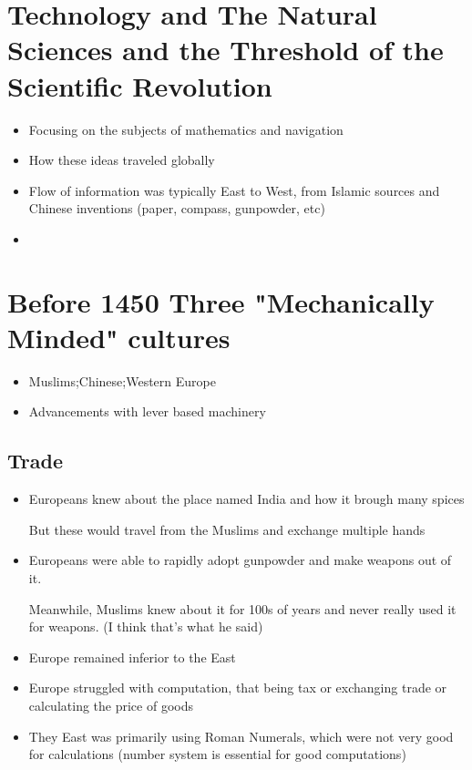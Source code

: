 \documentclass{article}
\begin{document}
\newpage

\section{Technology and The Natural Sciences and
the Threshold of the Scientific Revolution}

\begin{itemize}
  \item Focusing on the subjects of mathematics and navigation
  \item How these ideas traveled globally
  \item Flow of information was typically East to West,
    from Islamic sources and Chinese inventions (paper, compass, gunpowder, etc)
  \item
\end{itemize}

\section*{Before 1450 Three "Mechanically Minded" cultures}
\begin{itemize}
  \item Muslims;Chinese;Western Europe
  \item Advancements with lever based
    machinery
\end{itemize}

\subsection{Trade}
\begin{itemize}
  \item Europeans knew about the place named India and how it
    brough many spices

    But these would travel from the Muslims and exchange multiple hands
  \item Europeans were able to rapidly adopt gunpowder and make
    weapons out of it.

    Meanwhile, Muslims knew about it for 100s of years and never
    really used it for weapons. (I think that's what he said)
  \item Europe remained inferior to the East
  \item Europe struggled with computation, that being tax or
    exchanging trade or calculating the price of goods
  \item They East was primarily using Roman Numerals,
    which were not very good for calculations (number system is essential for good computations)
\end{itemize}
\end{document}
